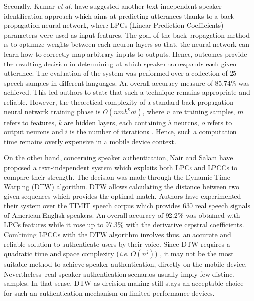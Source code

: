 \documentclass[cryptography,article,submit,moreauthors,pdftex,10pt,a4paper]{mdpi}
\begin{document}
Secondly, Kumar \textit{et al.} \cite{18} have suggested another text\hyp{}independent speaker identification approach which aims at predicting utterances thanks to a back-propagation neural network, where LPCs (Linear Prediction Coefficients) parameters were used as input features. The goal of the back-propagation method is to optimize weights between each neuron layers so that, the neural network can learn how to correctly map arbitrary inputs to outputs. Hence, outcomes provide the resulting decision in determining at which speaker corresponds each given utterance. The evaluation of the system was performed over a collection of 25 speech samples in different languages. An overall accuracy measure of 85.74\% was achieved. This led authors to state that such a technique remains appropriate and reliable. However, the theoretical complexity of a standard back-propagation neural network training phase is $O(nmh^k oi)$, where $n$ are training samples, $m$ refers to features, $k$ are hidden layers, each containing $h$ neurons, $o$ refers to output neurons and $i$ is the number of iterations \cite{23}. Hence, such a computation time remains overly expensive in a mobile device context.

On the other hand, concerning speaker authentication, Nair and Salam \cite{19} have proposed a text-independent system which exploits both LPCs and LPCCs to compare their strength. The decision was made through the Dynamic Time Warping (DTW) algorithm. DTW allows calculating the distance between two given sequences which provides the optimal match. Authors have experimented their system over the TIMIT speech corpus which provides 630 real speech signals of American English speakers. An overall accuracy of 92.2\% was obtained with LPCs features while it rose up to 97.3\% with the derivative cepstral coefficients. Combining LPCCs with the DTW algorithm involves thus, an accurate and reliable solution to authenticate users by their voice. Since DTW requires a quadratic time and space complexity (\textit{i.e.} $O(n^2)$) \cite{24}, it may not be the most suitable method to achieve speaker authentication, directly on the mobile device. Nevertheless, real speaker authentication scenarios usually imply few distinct samples. In that sense, DTW as decision-making still stays an acceptable choice for such an authentication mechanism on limited-performance devices.
\end{document}
